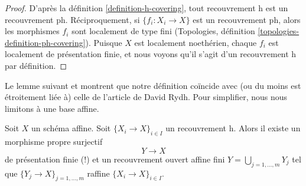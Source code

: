 \begin{proof}
D'après la définition \ref{definition-h-covering}, tout recouvrement h est un recouvrement ph.
Réciproquement, si $\{f_i : X_i \to X\}$ est un recouvrement ph, alors les morphismes
$f_i$ sont localement de type fini (Topologies, définition
\ref{topologies-definition-ph-covering}). Puisque $X$ est localement noethérien,
chaque $f_i$ est localement de présentation finie, et nous voyons qu'il s'agit
d'un recouvrement h par définition.
\end{proof}

\noindent
Le lemme suivant et \cite[Theorem 8.4]{rydh_descent}
montrent que notre définition coïncide avec (ou du moins est
étroitement liée à) celle de l'article \cite{rydh_descent}
de David Rydh. Pour simplifier, nous nous limitons à une base affine.

\begin{lemma}
\label{lemma-approximate-h-cover}
Soit $X$ un schéma affine. Soit $\{X_i \to X\}_{i \in I}$
un recouvrement h. Alors il existe un morphisme propre surjectif
$$
Y \longrightarrow X
$$
de présentation finie (!) et un recouvrement ouvert affine fini
$Y = \bigcup_{j = 1, \ldots, m} Y_j$ tel que
$\{Y_j \to X\}_{j = 1, \ldots, m}$ raffine $\{X_i \to X\}_{i \in I}$.
\end{lemma}

